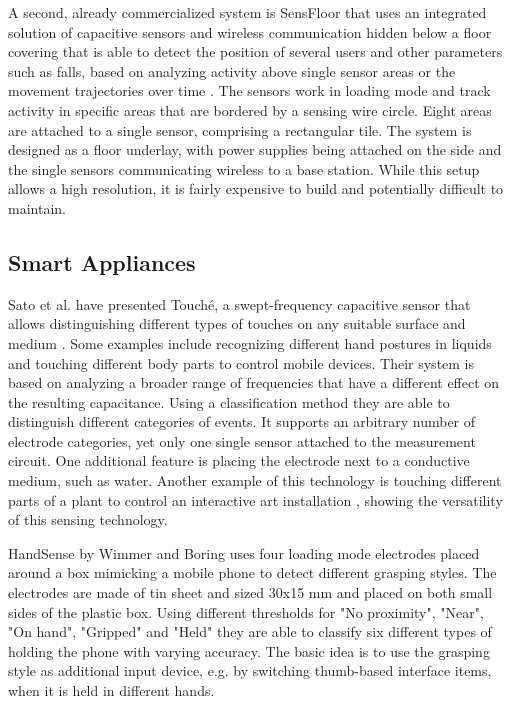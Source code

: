 A second, already commercialized system is SensFloor that uses an integrated solution of capacitive sensors and wireless communication hidden below a floor covering that is able to detect the position of several users and other parameters such as falls, based on analyzing activity above single sensor areas or the movement trajectories over time \cite{lauterbach2009}. The sensors work in loading mode and track activity in specific areas that are bordered by a sensing wire circle. Eight areas are attached to a single sensor, comprising a rectangular tile. The system is designed as a floor underlay, with power supplies being attached on the side and the single sensors communicating wireless to a base station. While this setup allows a high resolution, it is fairly expensive to build and potentially difficult to maintain. 

\subsection{Smart Appliances}
Sato et al. have presented Touché, a swept-frequency capacitive sensor that allows distinguishing different types of touches on any suitable surface and medium \cite{Sato2012}. Some examples include recognizing different hand postures in liquids and touching different body parts to control mobile devices. Their system is based on analyzing a broader range of frequencies that have a different effect on the resulting capacitance. Using a classification method they are able to distinguish different categories of events. It supports an arbitrary number of electrode categories, yet only one single sensor attached to the measurement circuit. One additional feature is placing the electrode next to a conductive medium, such as water. Another example of this technology is touching different parts of a plant to control an interactive art installation  \cite{poupyrev2012botanicus}, showing the versatility of this sensing technology.

HandSense by Wimmer and Boring uses four loading mode electrodes placed around a box mimicking a mobile phone to detect different grasping styles. The electrodes are made of tin sheet and sized 30x15 mm and placed on both small sides of the plastic box. Using different thresholds for "No proximity", "Near", "On hand", "Gripped" and "Held" they are able to classify six different types of holding the phone with varying accuracy. The basic idea is to use the grasping style as additional input device, e.g. by switching thumb-based interface items, when it is held in different hands.

